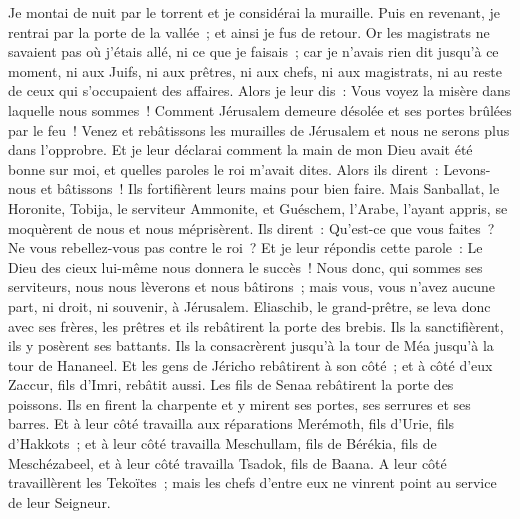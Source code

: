 \begin{multicols}{2}
Je montai de nuit par le torrent et je considérai la muraille. Puis en revenant, je rentrai par la porte de la vallée~; et ainsi je fus de retour.
Or les magistrats ne savaient pas où j'étais allé, ni ce que je faisais~; car je n'avais rien dit jusqu'à ce moment, ni aux Juifs, ni aux prêtres, ni aux chefs, ni aux magistrats, ni au reste de ceux qui s'occupaient des affaires.
Alors je leur dis~: Vous voyez la misère dans laquelle nous sommes~! Comment Jérusalem demeure désolée et ses portes brûlées par le feu~! Venez et rebâtissons les murailles de Jérusalem et nous ne serons plus dans l'opprobre.
Et je leur déclarai comment la main de mon Dieu avait été bonne sur moi, et quelles paroles le roi m'avait dites. Alors ils dirent~: Levons-nous et bâtissons~! Ils fortifièrent leurs mains pour bien faire.
Mais Sanballat, le Horonite, Tobija, le serviteur Ammonite, et Guéschem, l'Arabe, l'ayant appris, se moquèrent de nous et nous méprisèrent. Ils dirent~: Qu'est-ce que vous faites~? Ne vous rebellez-vous pas contre le roi~?
Et je leur répondis cette parole~: Le Dieu des cieux lui-même nous donnera le succès~! Nous donc, qui sommes ses serviteurs, nous nous lèverons et nous bâtirons~; mais vous, vous n'avez aucune part, ni droit, ni souvenir, à Jérusalem.
\VerseOne{}Eliaschib, le grand-prêtre, se leva donc avec ses frères, les prêtres et ils rebâtirent la porte des brebis. Ils la sanctifièrent, ils y posèrent ses battants. Ils la consacrèrent jusqu'à la tour de Méa jusqu'à la tour de Hananeel.
Et les gens de Jéricho rebâtirent à son côté~; et à côté d'eux Zaccur, fils d'Imri, rebâtit aussi.
Les fils de Senaa rebâtirent la porte des poissons. Ils en firent la charpente et y mirent ses portes, ses serrures et ses barres.
Et à leur côté travailla aux réparations Merémoth, fils d'Urie, fils d'Hakkots~; et à leur côté travailla Meschullam, fils de Bérékia, fils de Meschézabeel, et à leur côté travailla Tsadok, fils de Baana.
A leur côté travaillèrent les Tekoïtes~; mais les chefs d'entre eux ne vinrent point au service de leur Seigneur.

\end{multicols}
